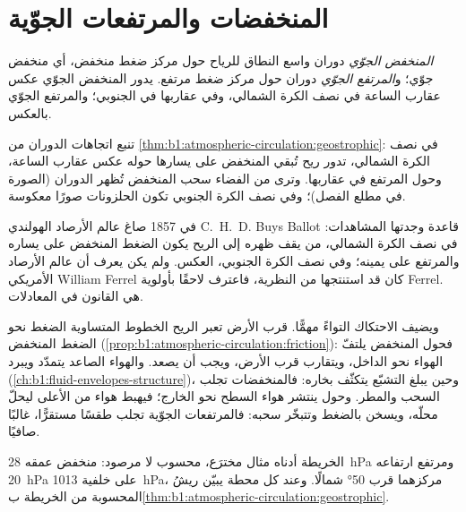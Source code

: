 \section{المنخفضات والمرتفعات الجوّية}\label{sec:b1:atmospheric-circulation:cyclones}

\begin{definition}\label{def:b1:atmospheric-circulation:cyclone}
\emph{المنخفض الجوّي} دوران واسع النطاق للرياح حول مركز ضغط منخفض، أي منخفض جوّي؛ و\emph{المرتفع الجوّي} دوران حول مركز ضغط مرتفع. يدور المنخفض الجوّي عكس عقارب الساعة في نصف الكرة الشمالي، وفي عقاربها في الجنوبي؛ والمرتفع الجوّي بالعكس.
\end{definition}

تنبع اتجاهات الدوران من \cref{thm:b1:atmospheric-circulation:geostrophic}: في نصف الكرة الشمالي، تدور ريح تُبقي المنخفض على يسارها حوله عكس عقارب الساعة، وحول المرتفع في عقاربها. وترى من الفضاء سحب المنخفض تُظهر الدوران (الصورة في مطلع الفصل)؛ وفي نصف الكرة الجنوبي تكون الحلزونات صورًا معكوسة.

\begin{history}
في 1857 صاغ عالم الأرصاد الهولندي C.~H.~D. Buys Ballot قاعدة وجدتها المشاهدات: في نصف الكرة الشمالي، من يقف ظهره إلى الريح يكون الضغط المنخفض على يساره والمرتفع على يمينه؛ وفي نصف الكرة الجنوبي، العكس. ولم يكن يعرف أن عالم الأرصاد الأمريكي William Ferrel كان قد استنتجها من النظرية، فاعترف لاحقًا بأولوية Ferrel.  هي القانون في المعادلات.
\end{history}

ويضيف الاحتكاك التواءً مهمًّا. قرب الأرض تعبر الريح الخطوط المتساوية الضغط نحو الضغط المنخفض (\cref{prop:b1:atmospheric-circulation:friction}): فحول المنخفض يلتفّ الهواء نحو الداخل، ويتقارب قرب الأرض، ويجب أن يصعد. والهواء الصاعد يتمدّد ويبرد  (\cref{ch:b1:fluid-envelopes-structure})، وحين يبلغ التشبّع يتكثّف بخاره: فالمنخفضات تجلب السحب والمطر. وحول  ينتشر هواء السطح نحو الخارج؛ فيهبط هواء من الأعلى ليحلّ محلّه، ويسخن بالضغط وتتبخّر سحبه: فالمرتفعات الجوّية تجلب طقسًا مستقرًّا، غالبًا صافيًا.

الخريطة أدناه مثال مخترَع، محسوب لا مرصود: منخفض عمقه \qty{28}{hPa} ومرتفع ارتفاعه \qty{20}{hPa} على خلفية \qty{1013}{hPa}، مركزهما قرب \ang{50} شمالًا. وعند كل محطة يبيّن ريشُ  المحسوبة من الخريطة ب\cref{thm:b1:atmospheric-circulation:geostrophic}.

